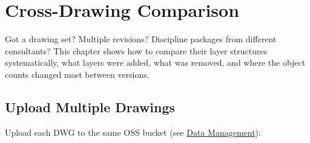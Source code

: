 \documentclass[
  11pt,
  letterpaper,
  DIV=11,
  numbers=noendperiod]{scrreprt}
\newenvironment{Shaded}{\begin{snugshade}}{\end{snugshade}}
\newcommand{\AttributeTok}[1]{\textcolor[rgb]{0.40,0.45,0.13}{#1}}
\newcommand{\ControlFlowTok}[1]{\textcolor[rgb]{0.00,0.23,0.31}{\textbf{#1}}}
\newcommand{\FunctionTok}[1]{\textcolor[rgb]{0.28,0.35,0.67}{#1}}
\newcommand{\NormalTok}[1]{\textcolor[rgb]{0.00,0.23,0.31}{#1}}
\newcommand{\OtherTok}[1]{\textcolor[rgb]{0.00,0.23,0.31}{#1}}
\newcommand{\SpecialCharTok}[1]{\textcolor[rgb]{0.37,0.37,0.37}{#1}}
\newcommand{\StringTok}[1]{\textcolor[rgb]{0.13,0.47,0.30}{#1}}
\begin{document}
\chapter{Cross-Drawing Comparison}\label{cross-drawing-comparison}

Got a drawing set? Multiple revisions? Discipline packages from
different consultants? This chapter shows how to compare their layer
structures systematically, what layers were added, what was removed, and
where the object counts changed most between versions.

\section{Upload Multiple Drawings}\label{upload-multiple-drawings}

Upload each DWG to the same OSS bucket (see
\hyperref[data-management]{Data Management}):

\begin{Shaded}
\end{Shaded}
\end{document}
